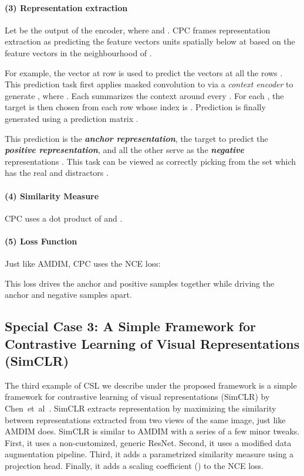 \documentclass{article}
\begin{document}
\paragraph{(3) Representation extraction}

Let  be the output of the encoder, where  and . CPC frames representation extraction as predicting the feature vectors  units spatially below at  based on the feature vectors in the neighbourhood of . 

For example, the vector at row  is used to predict the vectors at all the rows . This prediction task first applies masked convolution to  via a \textit{context encoder}  to generate ,  where . Each  summarizes the context around every . For each , the target is then chosen from each row whose index is . Prediction   is finally generated using a prediction matrix . 

This prediction  is the \textit{\textbf{anchor representation}}, the target to predict  the \textit{\textbf{positive representation}}, and all the other  serve as the \textit{\textbf{negative}} representations . This task can be viewed as correctly picking  from the set which has the real  and distractors .

\paragraph{(4) Similarity Measure}

CPC uses a dot product of  and .

\paragraph{(5) Loss Function}

Just like AMDIM, CPC uses the NCE loss:

This loss drives the anchor and positive samples together while driving the anchor and negative samples apart.

\subsection{Special Case 3: A Simple Framework for Contrastive Learning of Visual Representations (SimCLR)} 
\label{sec: simclr}

The third example of CSL we describe under the proposed framework is a simple framework for contrastive learning of visual representations (SimCLR) by Chen~et~al~\cite{chen2020simple}. SimCLR extracts representation by maximizing the similarity between representations extracted from two views of the same image, just like AMDIM does. SimCLR is similar to AMDIM with a series of a few minor tweaks. First, it uses a non-customized, generic ResNet. Second, it uses a modified data augmentation pipeline. Third, it adds a parametrized similarity measure using a projection head. Finally, it adds a scaling coefficient () to the NCE loss.
\end{document}
